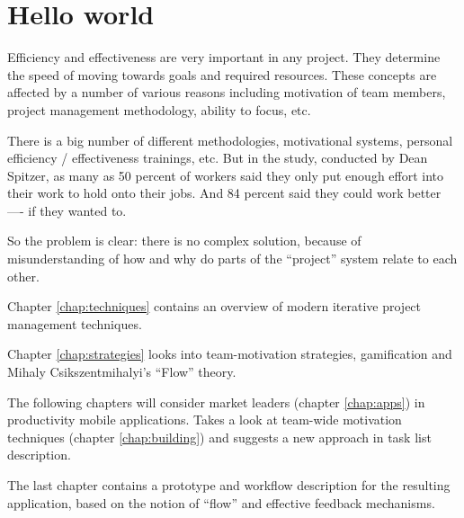 \chapter*{Hello world}


Efficiency and effectiveness are very important in any project. They determine the speed of moving towards goals and required resources. These concepts are affected by a number of various reasons including motivation of team members, project management methodology, ability to focus, etc.

There is a big number of different methodologies, motivational systems, personal efficiency / effectiveness trainings, etc. But in the study, conducted by Dean Spitzer, as many as 50 percent of workers said they only put enough effort into their work to hold onto their jobs. And 84 percent said they could work better —- if they wanted to. \cite{spitzer}

So the problem is clear: there is no complex solution, because of misunderstanding of how and why do parts of the ``project'' system relate to each other.

Chapter \ref{chap:techniques} contains an overview of modern iterative project management techniques.

Chapter \ref{chap:strategies} looks into team-motivation strategies, gamification and Mihaly Csikszentmihalyi's ``Flow'' theory.

The following chapters will consider market leaders (chapter \ref{chap:apps}) in productivity mobile applications. Takes a look at team-wide motivation techniques (chapter \ref{chap:building}) and suggests a new approach in task list description.

The last chapter contains a prototype and workflow description for the resulting application, based on the notion of ``flow'' and effective feedback mechanisms.